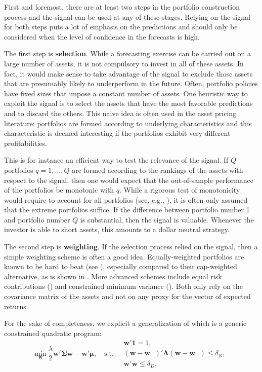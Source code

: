\documentclass[]{krantz}
\theoremstyle{definition}
\theoremstyle{definition}
\theoremstyle{definition}
\theoremstyle{remark}
\begin{document}
First and foremost, there are at least two steps in the portfolio
construction process and the signal can be used at any of these stages.
Relying on the signal for both steps puts a lot of emphasis on the
predictions and should only be considered when the level of confidence
in the forecasts is high.

The first step is \textbf{selection}. While a forecasting exercise can
be carried out on a large number of assets, it is not compulsory to
invest in all of these assets. In fact, it would make sense to take
advantage of the signal to exclude those assets that are presumably
likely to underperform in the future. Often, portfolio policies have
fixed sizes that impose a constant number of assets. One heuristic way
to exploit the signal is to select the assets that have the most
favorable predictions and to discard the others. This naive idea is
often used in the asset pricing literature: portfolios are formed
according to underlying characteristics and this characteristic is
deemed interesting if the portfolios exhibit very different
profitabilities.

This is for instance an efficient way to test the relevance of the
signal. If \(Q\) portfolios \(q=1,\dots,Q\) are formed according to the
rankings of the assets with respect to the signal, then one would expect
that the out-of-sample performance of the portfolios be monotonic with
\(q\). While a rigorous test of monotonicity would require to account
for all portfolios (see, e.g., \citet{romano2013testing}), it is often
only assumed that the extreme portfolios suffice. If the difference
between portfolio number 1 and portfolio number \(Q\) is substantial,
then the signal is valuable. Whenever the investor is able to short
assets, this amounts to a dollar neutral strategy.

The second step is \textbf{weighting}. If the selection process relied
on the signal, then a simple weighting scheme is often a good idea.
Equally-weighted portfolios are known to be hard to beat (see
\citet{demiguel2007optimal}), especially compared to their cap-weighted
alternative, as is shown in \citet{plyakha2014equal}. More advanced
schemes include equal risk contributions
(\citet{maillard2010properties}) and constrained minimum variance
(\citet{coqueret2015diversified}). Both only rely on the covariance
matrix of the assets and not on any proxy for the vector of expected
returns.

For the sake of completeness, we explicit a generalization of
\citet{coqueret2015diversified} which is a generic constrained quadratic
program: \begin{equation}
\label{eq:coq}
\underset{\textbf{w}}{\text{min}} \ \frac{\lambda}{2} \textbf{w}'\boldsymbol{\Sigma}\textbf{w}-\textbf{w}'\boldsymbol{\mu} , \quad \text{s.t.} \quad \begin{array}{ll} \textbf{w}'\textbf{1}=1, \\ (\textbf{w}-\textbf{w}_-)'\boldsymbol{\Lambda}(\textbf{w}-\textbf{w}_-) \le \delta_R,\\
\textbf{w}'\textbf{w} \le \delta_D,
\end{array}
\end{equation}
\end{document}
